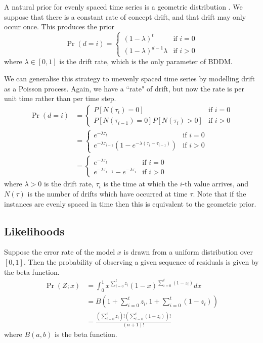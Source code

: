 A natural prior for evenly spaced time series is a geometric distribution \cite{fearnhead}\cite{BCMC}. We suppose that there is a constant rate of concept drift, and that drift may only occur once. This produces the prior %
\begin{equation}
  \Pr(d=i) = \begin{cases}
  (1-\lambda)^t & \text{if }i=0 \\
  (1-\lambda)^{d-1}\lambda & \text{if }i>0
  \end{cases}
\end{equation}
where $\lambda \in [0,1]$ is the drift rate, which is the only parameter of BDDM.

We can generalise this strategy to unevenly spaced time series by modelling drift as a Poisson process. Again, we have a ``rate" of drift, but now the rate is per unit time rather than per time step.
\begin{align}
  \Pr(d=i) &= \begin{cases}
  P[N(\tau_t)=0]& \text{if }i=0 \\
  P[N(\tau_{i-1})=0]P[N(\tau_i)>0] & \text{if }i>0
  \end{cases} \\
  &= \begin{cases}
  e^{-\lambda\tau_t} & \text{if }i=0 \\
  e^{-\lambda \tau_{i-1}}\left(1-e^{-\lambda(\tau_i-\tau_{i-1})}\right) & \text{if }i>0
  \end{cases} \\
  &= \begin{cases}
  e^{-\lambda\tau_t} & \text{if }i=0 \\
  e^{-\lambda \tau_{i-1}} - e^{-\lambda \tau_i} & \text{if }i>0 \label{eq:prior}
  \end{cases}
\end{align}
where $\lambda > 0$ is the drift rate, $\tau_i$ is the time at which the $i$-th value arrives, and $N(\tau)$ is the number of drifts which have occurred at time $\tau$. Note that if the instances are evenly spaced in time then this is equivalent to the geometric prior.

\subsection{Likelihoods}

Suppose the error rate of the model $x$ is drawn from a uniform distribution over $[0,1]$. Then the probability of observing a given sequence of residuals is given by the beta function.
\begin{align}
  \Pr(Z; x) &= \int_0^1 x^{\sum_{i=0}^t z_i}(1-x)^{\sum_{i=0}^t (1-z_i)} dx \\
  &= B\left(1+\sum_{i=0}^t z_i,1+\sum_{i=0}^t (1-z_i)\right) \\
  &= \frac{\left(\sum_{i=0}^t z_i\right)! \left(\sum_{i=0}^t (1-z_i)\right)!}{(n+1)!}
\end{align}
where $B(a,b)$ is the beta function.

